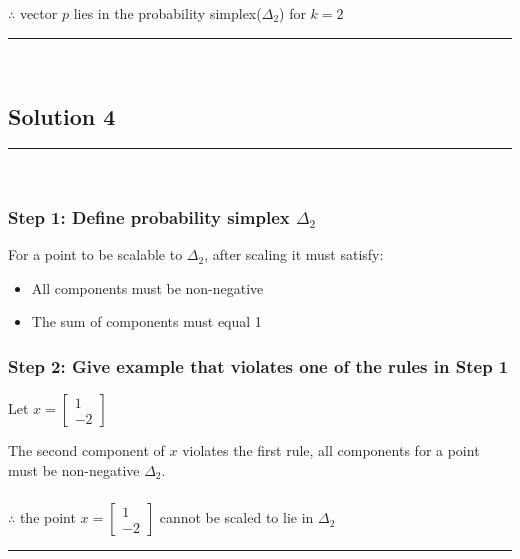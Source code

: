 \documentclass{article}
\begin{document}
\subsubsection*{\normalfont}{$\therefore$ vector $p$ lies in the probability simplex($\Delta_2$) for $k=2$}

\noindent\rule{\textwidth}{0.4pt}\\

\newpage

\subsection*{Solution 4}
\noindent\rule{\textwidth}{0.4pt}\\

\subsubsection*{Step 1: Define probability simplex $\Delta_2$ }
\parbox{\textwidth}{

For a point to be scalable to $\Delta_2$, after scaling it must satisfy:
\begin{itemize}
\item All components must be non-negative
\item The sum of components must equal 1
\end{itemize}
}

\subsubsection*{Step 2: Give example that violates one of the rules in Step 1}
\parbox{\textwidth}{
Let $x = \begin{bmatrix} 1 \\ -2 \end{bmatrix}$

The second component of $x$ violates the first rule, all components for a point must be non-negative $\Delta_2$.
}

\subsubsection*{\normalfont}{$\therefore$ the point $x = \begin{bmatrix} 1 \\ -2 \end{bmatrix}$ cannot be scaled to lie in $\Delta_{2}$}

\noindent\rule{\textwidth}{0.4pt}\\
\end{document}
